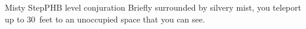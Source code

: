 \begin{spell}{Misty Step}{PHB}{ level conjuration}
{
}
Briefly surrounded by silvery mist, you teleport up to 30~feet
to an unoccupied space that you can see.
\end{spell}